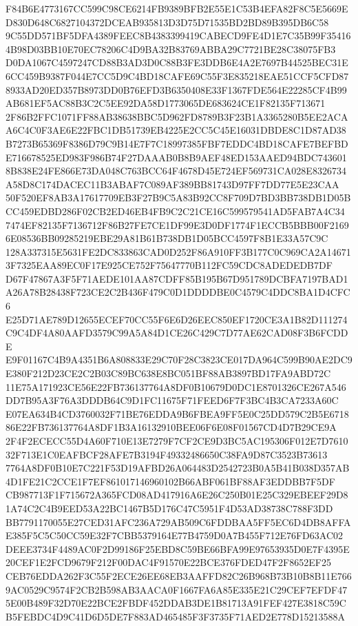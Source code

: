 \documentclass[UTF8,fontset=fandol,zihao=-4,a4paper]{ctexart}
\begin{document}
{{F84B6E4773167CC599C98CE6214FB9389BFB2E55E1C53B4EFA82F8C5E5669ED830D648C6827104372DCEAB935813D3D75D71535BD2BD89B395DB6C58
9C55DD571BF5DFA4389FEEC8B4383399419CABECD9FE4D1E7C35B99F354164B98D03BB10E70EC78206C4D9BA32B83769ABBA29C7721BE28C38075FB3
D0DA1067C4597247CD88B3AD3D0C88B3FE3DDB6E4A2E7697B44525BEC31E6CC459B9387F044E7CC5D9C4BD18CAFE69C55F3E835218EAE51CCF5CFD87
8933AD20ED357B8973DD0B76EFD3B6350408E33F1367FDE564E22285CF4B99AB681EF5AC88B3C2C5EE92DA58D1773065DE683624CE1F82135F713671
2F86B2FFC1071FF88AB38638BBC5D962FD8789B3F23B1A3365280B5EE2ACAA6C4C0F3AE6E22FBC1DB51739EB4225E2CC5C45E16031DBDE8C1D87AD38
B7273B65369F8386D79C9B14E7F7C18997385FBF7EDDC4BD18CAFE7BEFBDE716678525ED983F986B74F27DAAAB0B8B9AEF48ED153AAED94BDC743601
8B838E24FE866E73DA048C763BCC64F4678D45E724EF569731CA028E8326734A58D8C174DACEC11B3ABAF7C089AF389BB81743D97FF7DD77E5E23CAA
50F520EF8AB3A17617709EB3F27B9C5A83B92CC8F709D7BD3BB738DB1D05BCC459EDBD286F02CB2ED46EB4FB9C2C21CE16C599579541AD5FAB7A4C34
7474EF82135F7136712F86B27FE7CE1DF99E3D0DF1774F1ECCB5BBB00F21696E08536BB09285219EBE29A81B61B738DB1D05BCC4597F8B1E33A57C9C
128A337315E5631FE2DC833863CAD0D252F86A910FF3B177C0C969CA2A146713F7325EAA89EC0F17E925CE752F75647770B112FC59CDC8ADEDEDB7DF
D67F47867A3F5F71AEDE101AA87CDFF85B195B67D951789DCBFA7197BAD1A26A78B28438F723CE2C2B436F479C0D1DDDDBE0C4579C4DDC8BA1D4CFC6
E25D71AE789D12655ECEF70CC55F6E6D26EEC850EF1720CE3A1B82D111274C9C4DF4A80AAFD3579C99A5A84D1CE26C429C7D77AE62CAD08F3B6FCDDE
E9F01167C4B9A4351B6A808833E29C70F28C3823CE017DA964C599B90AE2DC9E380F212D23CE2C2B03C89BC638E8BC051BF88AB3897BD17FA9ABD72C
11E75A171923CE56E22FB736137764A8DF0B10679D0DC1E8701326CE267A546DD7B95A3F76A3DDDB64C9D1FC11675F71FEED6F7F3BC4B3CA7233A60C
E07EA634B4CD3760032F71BE76EDDA9B6FBEA9FF5E0C25DD579C2B5E671886E22FB736137764A8DF1B3A16132910BEE06F6E08F01567CD4D7B29CE9A
2F4F2ECECC55D4A60F710E13E7279F7CF2CE9D3BC5AC195306F012E7D761032F713E1C0EAFBCF28AFE7B3194F49332486650C38FA9D87C3523B73613
7764A8DF0B10E7C221F53D19AFBD26A064483D2542723B0A5B41B038D357AB4D1FE21C2CCE1F7EF861017146960102B66ABF061BF88AF3EDDBB7F5DF
CB987713F1F715672A365FCD08AD417916A6E26C250B01E25C329EBEEF29D81A74C2C4B9EED53A22BC1467B5D176C47C5951F4D53AD38738C788F3DD
BB7791170055E27CED31AFC236A729AB509C6FDDBAA5FF5EC6D4DB8AFFAE385F5C5C50CC59E32F7CBB5379164E77B4759D0A7B455F712E76FD63AC02
DEEE3734F4489AC0F2D99186F25EBD8C59BE66BFA99E97653935D0E7F4395E20CEF1E2FCD9679F212F00DAC4F91570E22BCE376FDED47F2F8652EF25
CEB76EDDA262F3C55F2ECE26EE68EB3AAFFD82C26B968B73B10B8B11E7669AC0529C9574F2CB2B598AB3AACA0F1667FA6A85E335E21C29CEF7EFDF47
5E00B489F32D70E22BCE2FBDF452DDAB3DE1B81713A91FEF427E3818C59CB5FEBDC4D9C41D6D5DE7F883AD465485F3F3735F71AED2E778D15213588A
}}
\end{document}
